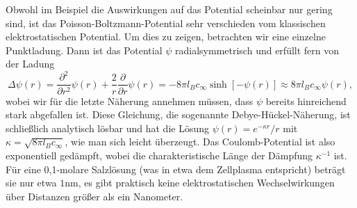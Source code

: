 Obwohl im Beispiel die Auswirkungen auf das Potential scheinbar nur
gering sind, ist das Poisson-Boltzmann-Potential sehr verschieden vom
klassischen elektrostatischen Potential. Um dies zu zeigen, betrachten
wir eine einzelne Punktladung. Dann ist das Potential $\psi$
radialsymmetrisch und erfüllt fern von der Ladung
\begin{equation}
  \Delta \psi(r) =\frac{\partial^2}{\partial r^2} \psi(r)
  +\frac{2}{r}\frac{\partial}{\partial r} \psi(r) =
  -8\pi l_B c_\infty\sinh[-\psi(r)] \approx 8\pi l_B c_\infty\psi(r),
\end{equation}
wobei wir für die letzte Näherung annehmen müssen, dass $\psi$ bereits
hinreichend stark abgefallen ist. Diese Gleichung, die sogenannte
Debye-Hückel-Näherung, ist schließlich analytisch lösbar und hat die
Lösung $\psi(r) = e^{-\kappa r}/r$
mit $\kappa = \sqrt{8\pi l_B c_\infty}$, wie man sich leicht
überzeugt. Das Coulomb-Potential ist also exponentiell gedämpft, wobei
die charakteristische Länge der Dämpfung $\kappa^{-1}$ ist. Für eine
0,1-molare Salzlösung (was in etwa dem Zellplasma entspricht) beträgt
sie nur etwa $1$nm, \dh es gibt praktisch keine elektrostatischen
Wechselwirkungen über Distanzen größer als ein Nanometer.

%

